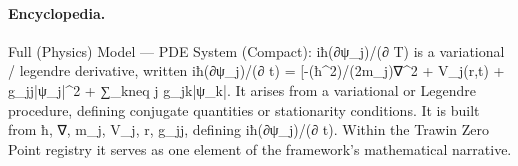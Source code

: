 \paragraph{Encyclopedia.}
Full (Physics) Model — PDE System (Compact): iħ(∂ψ\_j)/(∂ T) is a variational / legendre derivative, written iħ(∂ψ\_j)/(∂ t) = [-(ħ\textasciicircum{}2)/(2m\_j)∇\textasciicircum{}2 + V\_j(r,t) + g\_jj|ψ\_j|\textasciicircum{}2 + ∑\_kneq j g\_jk|ψ\_k|. It arises from a variational or Legendre procedure, defining conjugate quantities or stationarity conditions. It is built from ħ, ∇, m\_j, V\_j, r, g\_jj, defining iħ(∂ψ\_j)/(∂ t). Within the Trawin Zero Point registry it serves as one element of the framework's mathematical narrative.
